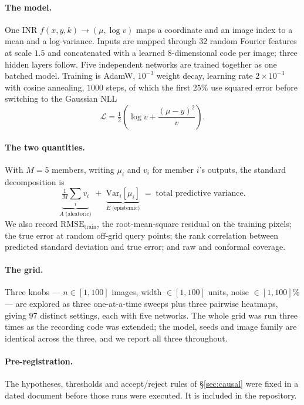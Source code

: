 \documentclass[10pt]{article}
\begin{document}
\paragraph{The model.} One INR $f(x, y, k) \to (\mu, \log v)$ maps a coordinate and an image
index to a mean and a log-variance. Inputs are mapped through $32$ random Fourier features
\citep{tancik2020, rahimi2007} at scale $1.5$ and concatenated with a learned $8$-dimensional
code per image; three hidden layers follow. Five independent networks are trained together as
one batched model. Training is AdamW, $10^{-3}$ weight decay, learning rate $2\times10^{-3}$
with cosine annealing, $1000$ steps, of which the first $25\%$ use squared error before
switching to the Gaussian NLL
\begin{equation}
\mathcal{L} = \tfrac12\left(\log v + \frac{(\mu - y)^2}{v}\right).
\label{eq:nll}
\end{equation}

\paragraph{The two quantities.} With $M=5$ members, writing $\mu_i$ and $v_i$ for member
$i$'s outputs, the standard decomposition \citep{kendall2017, valdenegro2022} is
\begin{equation}
\underbrace{\tfrac1M\textstyle\sum_i v_i}_{A \;\text{(aleatoric)}}
\;+\;
\underbrace{\mathrm{Var}_i[\mu_i]}_{E \;\text{(epistemic)}}
\;=\; \text{total predictive variance}.
\label{eq:decomp}
\end{equation}
We also record $\mathrm{RMSE}_{\mathrm{train}}$, the root-mean-square residual on the
training pixels; the true error at random off-grid query points; the rank correlation between
predicted standard deviation and true error; and raw and conformal coverage.

\paragraph{The grid.} Three knobs --- $n \in [1,100]$ images, width $\in [1,100]$ units,
noise $\in [1,100]\%$ --- are explored as three one-at-a-time sweeps plus three pairwise
heatmaps, giving 97 distinct settings, each with five networks. The whole grid was run three
times as the recording code was extended; the model, seeds and image family are identical
across the three, and we report all three throughout.

\paragraph{Pre-registration.} The hypotheses, thresholds and accept/reject rules of
\S\ref{sec:causal} were fixed in a dated document before those runs were executed. It is
included in the repository.
\end{document}
